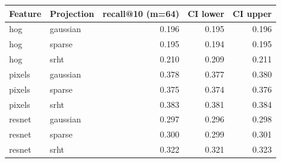 \begin{tabular}{llrrr}
\toprule
Feature & Projection & recall@10 (m=64) & CI lower & CI upper \\
\midrule
hog & gaussian & 0.196 & 0.195 & 0.196 \\
hog & sparse & 0.195 & 0.194 & 0.195 \\
hog & srht & 0.210 & 0.209 & 0.211 \\
pixels & gaussian & 0.378 & 0.377 & 0.380 \\
pixels & sparse & 0.375 & 0.374 & 0.376 \\
pixels & srht & 0.383 & 0.381 & 0.384 \\
resnet & gaussian & 0.297 & 0.296 & 0.298 \\
resnet & sparse & 0.300 & 0.299 & 0.301 \\
resnet & srht & 0.322 & 0.321 & 0.323 \\
\bottomrule
\end{tabular}

